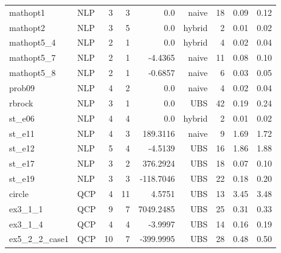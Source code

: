\documentclass[a4paper,landscape]{article}
\begin{document}
\begin{center}
\begin{tabular}{|l|l|r|r|r|r|r|r|r|}
mathopt1 & NLP & 3 & 3 & 0.0 & naive & 18 & 0.09 & 0.12 \\
mathopt2 & NLP & 3 & 5 & 0.0 & hybrid & 2 & 0.01 & 0.02 \\
mathopt5\_4 & NLP & 2 & 1 & 0.0 & hybrid & 4 & 0.02 & 0.04 \\
mathopt5\_7 & NLP & 2 & 1 & -4.4365 & naive & 11 & 0.08 & 0.10 \\
mathopt5\_8 & NLP & 2 & 1 & -0.6857 & naive & 6 & 0.03 & 0.05 \\
prob09 & NLP & 4 & 2 & 0.0 & naive & 4 & 0.02 & 0.04 \\
rbrock & NLP & 3 & 1 & 0.0 & UBS & 42 & 0.19 & 0.24 \\
st\_e06 & NLP & 4 & 4 & 0.0 & hybrid & 2 & 0.01 & 0.02 \\
st\_e11 & NLP & 4 & 3 & 189.3116 & naive & 9 & 1.69 & 1.72 \\
st\_e12 & NLP & 5 & 4 & -4.5139 & UBS & 16 & 1.86 & 1.88 \\
st\_e17 & NLP & 3 & 2 & 376.2924 & UBS & 18 & 0.07 & 0.10 \\
st\_e19 & NLP & 3 & 3 & -118.7046 & UBS & 22 & 0.18 & 0.20 \\
circle & QCP & 4 & 11 & 4.5751 & UBS & 13 & 3.45 & 3.48 \\
ex3\_1\_1 & QCP & 9 & 7 & 7049.2485 & UBS & 25 & 0.31 & 0.33 \\
ex3\_1\_4 & QCP & 4 & 4 & -3.9997 & UBS & 14 & 0.16 & 0.19 \\
ex5\_2\_2\_case1 & QCP & 10 & 7 & -399.9995 & UBS & 28 & 0.48 & 0.50 \\
\hline  \end{tabular}
\end{center}
\newpage
\end{document}
